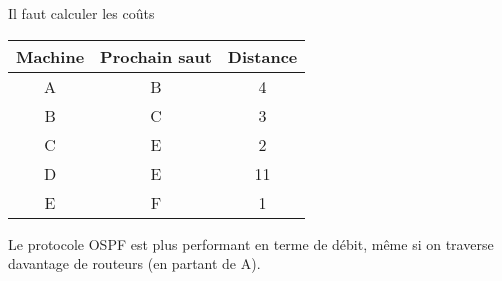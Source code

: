 \documentclass[svgnames,11pt]{beamer}
\begin{document}
\begin{frame}
    \frametitle{}
Il faut calculer les coûts
    \begin{center}
        \begin{tabular}{|*{3}{c|}}
            \hline
            Machine&Prochain saut&Distance\\
            \hline
            A&B&4\\
            \hline
            B&C&3\\
            \hline
            C&E&2\\
            \hline
            D&E&11\\
            \hline
            E&F&1\\
            \hline
        \end{tabular}
    \end{center}
Le protocole OSPF est plus performant en terme de débit, même si on traverse davantage de routeurs (en partant de A).
\end{frame}
\end{document}
